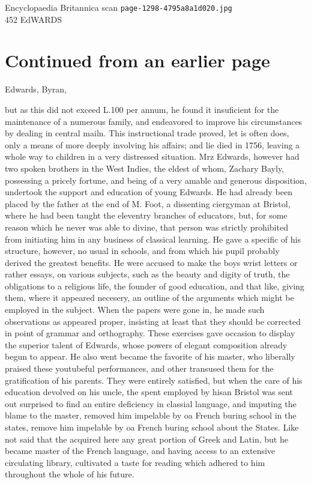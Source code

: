 \documentclass{article}
\begin{document}
\begin{center}
{\Large Encyclopaedia Britannica scan \texttt{page-1298-4795a8a1d020.jpg}}\\[0.5em]
452 EdWARDS
\end{center}
\section*{Continued from an earlier page}
Edwards, Byran,

but as this did not exceed L.100 per annum, he found it insuficient for the maintenance of a numerous family, and endeavored to improve his circumstances by dealing in central mailn. This instructional trade proved, let is often does, only a means of more deeply involving his affairs; and lie died in 1756, leaving a whole way to children in a very distressed situation. Mrz Edwards, however had two spoken brothers in the West Indies, the eldest of whom, Zachary Bayly, possessing a pricely fortune, and being of a very amable and generous disposition, undertook the support and education of young Edwards. He had already been placed by the father at the end of M. Foot, a dissenting ciergyman at Bristol, where he had been taught the eleventry branches of educators, but, for some reason which he never was able to divine, that person was strictly prohibited from initiating him in any business of classical learning. He gave a specific of his structure, however, no usual in schools, and from which his pupil probably derived the greatest benefits. He were accused to make the boys wrist letters or rather essays, on various subjects, such as the beauty and digity of truth, the obligations to a religious life, the founder of good education, and that like, giving them, where it appeared necesery, an outline of the arguments which might be employed in the subject. When the papers were gone in, he made such observations as appeared proper, insisting at least that they should be corrected in point of grammar and orthography. These exercises gave occasion to display the superior talent of Edwards, whose powers of elegant composition already begun to appear. He also went became the favorite of his master, who liberally praised these youtubeful performances, and other transused them for the gratification of his parents. They were entirely satisfied, but when the care of his education devolved on his uncle, the spent employed by hisan Bristol was sent out surprised to find an entire deficiency in classial language, and imputing the blame to the master, removed him impelable by oa French buring school in the states, remove him impelable by oa French buring school about the States. Like not said that the acquired here any great portion of Greek and Latin, but he became master of the French language, and having access to an extensive circulating library, cultivated a taste for reading which adhered to him throughout the whole of his future.
\end{document}
